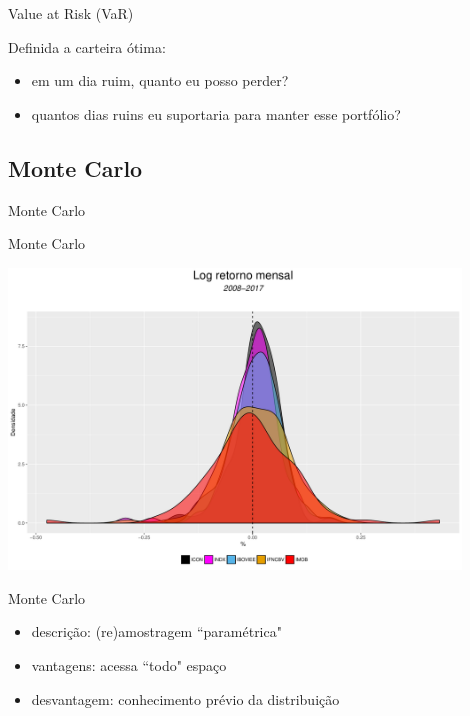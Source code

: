 \documentclass{beamer}
\begin{document}
\begin{frame}{Value at Risk (VaR)}

Definida a carteira ótima:

\begin{itemize}
\item em um dia ruim, quanto eu posso perder? 
\pause
\item quantos dias ruins eu suportaria para manter esse portfólio?
\end{itemize}

\end{frame}


\subsection{Monte Carlo }

\begin{frame}{ }
    \begin{block}{ }
      \Huge  Monte Carlo
    \end{block}
\end{frame}

\begin{frame}{Monte Carlo}

\begin{center}
 \includegraphics[height=8cm,keepaspectratio]{decritiva_indices.pdf}
 \end{center}

\end{frame}



\begin{frame}{Monte Carlo}

\begin{itemize}
\item descrição: (re)amostragem ``paramétrica"
\item vantagens: acessa ``todo" espaço
\item desvantagem: conhecimento prévio da distribuição
\end{itemize}

\end{frame}
\end{document}
